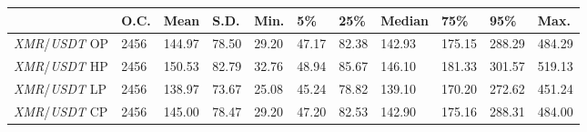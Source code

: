 \begin{tabular}{lllllllllll}
\toprule
 & \textbf{O.C.} & \textbf{Mean} & \textbf{S.D.} & \textbf{Min.} & \textbf{5\%} & \textbf{25\%} & \textbf{Median} & \textbf{75\%} & \textbf{95\%} & \textbf{Max.} \\
\midrule
\emph{XMR}/\emph{USDT} OP & 2456 & 144.97 & 78.50 & 29.20 & 47.17 & 82.38 & 142.93 & 175.15 & 288.29 & 484.29 \\
\emph{XMR}/\emph{USDT} HP & 2456 & 150.53 & 82.79 & 32.76 & 48.94 & 85.67 & 146.10 & 181.33 & 301.57 & 519.13 \\
\emph{XMR}/\emph{USDT} LP & 2456 & 138.97 & 73.67 & 25.08 & 45.24 & 78.82 & 139.10 & 170.20 & 272.62 & 451.24 \\
\emph{XMR}/\emph{USDT} CP & 2456 & 145.00 & 78.47 & 29.20 & 47.20 & 82.53 & 142.90 & 175.16 & 288.31 & 484.00 \\
\bottomrule
\end{tabular}
